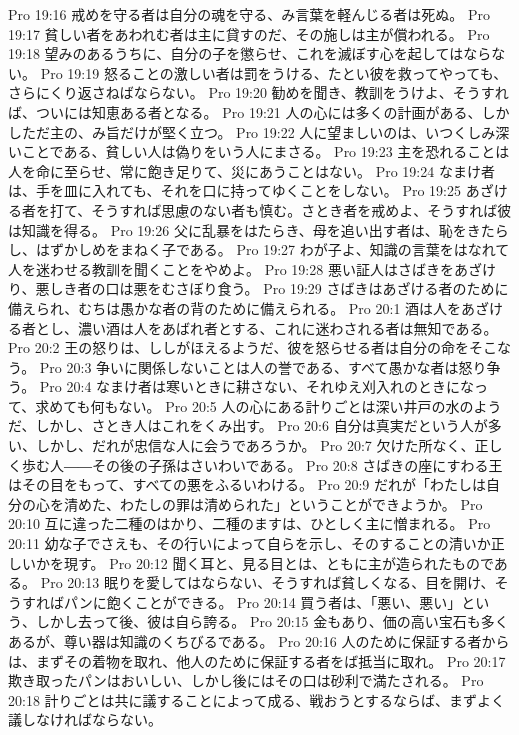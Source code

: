 Pro 19:16  戒めを守る者は自分の魂を守る、み言葉を軽んじる者は死ぬ。
Pro 19:17  貧しい者をあわれむ者は主に貸すのだ、その施しは主が償われる。
Pro 19:18  望みのあるうちに、自分の子を懲らせ、これを滅ぼす心を起してはならない。
Pro 19:19  怒ることの激しい者は罰をうける、たとい彼を救ってやっても、さらにくり返さねばならない。
Pro 19:20  勧めを聞き、教訓をうけよ、そうすれば、ついには知恵ある者となる。
Pro 19:21  人の心には多くの計画がある、しかしただ主の、み旨だけが堅く立つ。
Pro 19:22  人に望ましいのは、いつくしみ深いことである、貧しい人は偽りをいう人にまさる。
Pro 19:23  主を恐れることは人を命に至らせ、常に飽き足りて、災にあうことはない。
Pro 19:24  なまけ者は、手を皿に入れても、それを口に持ってゆくことをしない。
Pro 19:25  あざける者を打て、そうすれば思慮のない者も慎む。さとき者を戒めよ、そうすれば彼は知識を得る。
Pro 19:26  父に乱暴をはたらき、母を追い出す者は、恥をきたらし、はずかしめをまねく子である。
Pro 19:27  わが子よ、知識の言葉をはなれて人を迷わせる教訓を聞くことをやめよ。
Pro 19:28  悪い証人はさばきをあざけり、悪しき者の口は悪をむさぼり食う。
Pro 19:29  さばきはあざける者のために備えられ、むちは愚かな者の背のために備えられる。
Pro 20:1  酒は人をあざける者とし、濃い酒は人をあばれ者とする、これに迷わされる者は無知である。
Pro 20:2  王の怒りは、ししがほえるようだ、彼を怒らせる者は自分の命をそこなう。
Pro 20:3  争いに関係しないことは人の誉である、すべて愚かな者は怒り争う。
Pro 20:4  なまけ者は寒いときに耕さない、それゆえ刈入れのときになって、求めても何もない。
Pro 20:5  人の心にある計りごとは深い井戸の水のようだ、しかし、さとき人はこれをくみ出す。
Pro 20:6  自分は真実だという人が多い、しかし、だれが忠信な人に会うであろうか。
Pro 20:7  欠けた所なく、正しく歩む人――その後の子孫はさいわいである。
Pro 20:8  さばきの座にすわる王はその目をもって、すべての悪をふるいわける。
Pro 20:9  だれが「わたしは自分の心を清めた、わたしの罪は清められた」ということができようか。
Pro 20:10  互に違った二種のはかり、二種のますは、ひとしく主に憎まれる。
Pro 20:11  幼な子でさえも、その行いによって自らを示し、そのすることの清いか正しいかを現す。
Pro 20:12  聞く耳と、見る目とは、ともに主が造られたものである。
Pro 20:13  眠りを愛してはならない、そうすれば貧しくなる、目を開け、そうすればパンに飽くことができる。
Pro 20:14  買う者は、「悪い、悪い」という、しかし去って後、彼は自ら誇る。
Pro 20:15  金もあり、価の高い宝石も多くあるが、尊い器は知識のくちびるである。
Pro 20:16  人のために保証する者からは、まずその着物を取れ、他人のために保証する者をば抵当に取れ。
Pro 20:17  欺き取ったパンはおいしい、しかし後にはその口は砂利で満たされる。
Pro 20:18  計りごとは共に議することによって成る、戦おうとするならば、まずよく議しなければならない。
